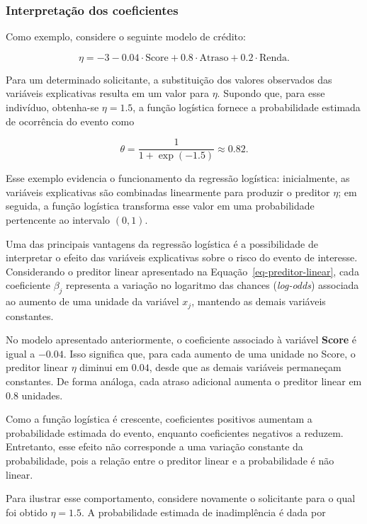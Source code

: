 \documentclass[
  brazilian,
  12pt,
  letterpaper,
  DIV=11,
  numbers=noendperiod]{scrartcl}
\begin{document}
\subsubsection{Interpretação dos coeficientes}\label{sec-interpre-coefs}

Como exemplo, considere o seguinte modelo de crédito:

\[
\eta = -3 - 0.04 \cdot \text{Score} + 0.8 \cdot \text{Atraso} + 0.2 \cdot \text{Renda}.
\]

Para um determinado solicitante, a substituição dos valores observados
das variáveis explicativas resulta em um valor para \(\eta\). Supondo
que, para esse indivíduo, obtenha-se \(\eta = 1.5\), a função logística
fornece a probabilidade estimada de ocorrência do evento como

\[
\theta = \frac{1}{1+\exp(-1.5)} \approx 0.82.
\]

Esse exemplo evidencia o funcionamento da regressão logística:
inicialmente, as variáveis explicativas são combinadas linearmente para
produzir o preditor \(\eta\); em seguida, a função logística transforma
esse valor em uma probabilidade pertencente ao intervalo \((0,1)\).

Uma das principais vantagens da regressão logística é a possibilidade de
interpretar o efeito das variáveis explicativas sobre o risco do evento
de interesse. Considerando o preditor linear apresentado na
Equação~\ref{eq-preditor-linear}, cada coeficiente \(\beta_j\)
representa a variação no logaritmo das chances (\emph{log-odds})
associada ao aumento de uma unidade da variável \(x_j\), mantendo as
demais variáveis constantes.

No modelo apresentado anteriormente, o coeficiente associado à variável
\textbf{Score} é igual a \(-0.04\). Isso significa que, para cada
aumento de uma unidade no Score, o preditor linear \(\eta\) diminui em
\(0.04\), desde que as demais variáveis permaneçam constantes. De forma
análoga, cada atraso adicional aumenta o preditor linear em \(0.8\)
unidades.

Como a função logística é crescente, coeficientes positivos aumentam a
probabilidade estimada do evento, enquanto coeficientes negativos a
reduzem. Entretanto, esse efeito não corresponde a uma variação
constante da probabilidade, pois a relação entre o preditor linear e a
probabilidade é não linear.

Para ilustrar esse comportamento, considere novamente o solicitante para
o qual foi obtido \(\eta = 1.5\). A probabilidade estimada de
inadimplência é dada por
\end{document}
